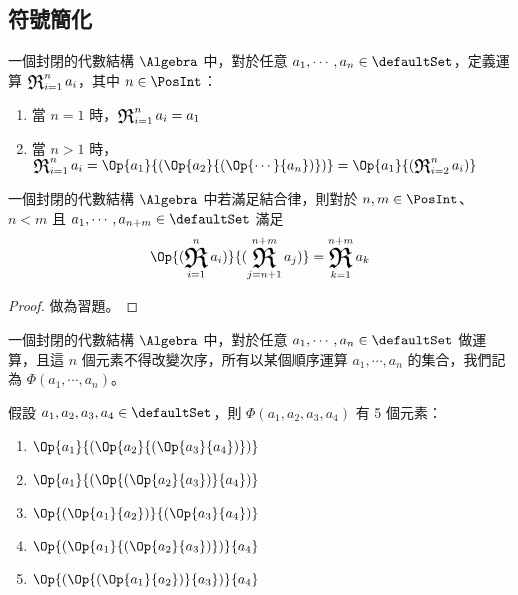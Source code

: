 \documentclass[12pt,a4paper,oneside]{report}
\begin{document}
\begin{CJK}{UTF8}{bkai}
\subsection{符號簡化}

\newcommand{\opRelation}{\ensuremath{\mathfrak{R}}}
\newcommand{\opR}{\mathop{\vphantom{\sum}\mathchoice
  {\vcenter{\hbox{\huge \opRelation}}}
  {\vcenter{\hbox{\Large \opRelation}}}
  {\mathrm{\opRelation}}
  {\mathrm{\opRelation}}
}\displaylimits}

\begin{mydef}[連運算記號]
\label{def:algebra:accumulating_relational_notation}
一個封閉的代數結構 $\Algebra$ 中，對於任意 $a_1,\cdots,a_n\in{\defaultSet}$，定義運算 $\opR^{n}_{i=1}{a_i}$，其中 $n\in{\PosInt}$：
\begin{enumerate}
\item 當 $n=1$ 時，$\opR^{n}_{i=1}{a_i}=a_1$
\item 當 $n>1$ 時，$\opR^{n}_{i=1}{a_i}=\Op{a_1}{(\Op{a_2}{(\Op{\cdots}{a_n})})}=\Op{a_1}{(\opR^{n}_{i=2}{a_i})}$
\end{enumerate}
\end{mydef}

\begin{mypropo}[連運算性質]
\label{pro:algebra:accumulating_relational_notation}
\label{exe:algebra:accumulating_relational_notation}
一個封閉的代數結構 $\Algebra$ 中若滿足結合律，則對於 $n,m\in{\PosInt}$、$n<m$ 且 $a_1,\cdots,a_{n+m}\in{\defaultSet}$ 滿足
\begin{align*}
\Op{(\opR^{n}_{i=1}{a_i})}{(\opR^{n+m}_{j=n+1}{a_j})}=\opR^{n+m}_{k=1}{a_k}
\end{align*}
\end{mypropo}
\begin{proof}
做為習題。
\end{proof}

\begin{mydef}
\label{def:algebra:general_associativity}
一個封閉的代數結構 $\Algebra$ 中，對於任意 $a_1,\cdots,a_n\in{\defaultSet}$ 做運算，且這 $n$ 個元素不得改變次序，所有以某個順序運算 $a_1,\cdots,a_n$ 的集合，我們記為 $\Phi(a_1,\cdots,a_n)$。
\end{mydef}
\begin{myexample}
假設 $a_1,a_2,a_3,a_4\in{\defaultSet}$，則 $\Phi(a_1,a_2,a_3,a_4)$ 有 5 個元素：
\begin{enumerate}
\item $\Op{a_1}{(\Op{a_2}{(\Op{a_3}{a_4})})}$
\item $\Op{a_1}{(\Op{(\Op{a_2}{a_3})}{a_4})}$
\item $\Op{(\Op{a_1}{a_2})}{(\Op{a_3}{a_4})}$
\item $\Op{(\Op{a_1}{(\Op{a_2}{a_3})})}{a_4}$
\item $\Op{(\Op{(\Op{a_1}{a_2})}{a_3})}{a_4}$
\end{enumerate}
\end{myexample}


\end{CJK}
\end{document}
